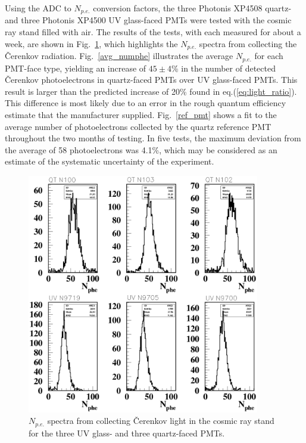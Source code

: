 Using the ADC to $N_{p.e.}$ conversion factors, the three Photonis XP4508
quartz- and three Photonis XP4500 UV glass-faced PMTs were tested with 
the cosmic ray stand filled with air.  The results of the tests, with each
measured for about a week, are shown in Fig.~\ref{numphe_all}, which
highlights the $N_{p.e.}$ spectra from collecting the {\v C}erenkov
radiation.  Fig.~\ref{avg_numphe} illustrates the average $N_{p.e.}$ for 
each PMT-face type, yielding an increase of $45 \pm 4$\% in the number of 
detected {\v C}erenkov photoelectrons in quartz-faced PMTs over UV 
glass-faced PMTs.  This result is larger than the predicted increase of 20\% 
found in eq.(\ref{eq:light_ratio}).  This difference is most likely due to 
an error in the rough quantum efficiency estimate that the manufacturer 
supplied.  Fig.~\ref{ref_pmt} shows a fit to the average number of 
photoelectrons collected by the quartz reference PMT throughout the two 
months of testing.  In five tests, the maximum deviation from the average of 
58 photoelectrons was 4.1\%, which may be considered as an estimate of the 
systematic uncertainty of the experiment. 

\begin{figure}
\hspace{0.5cm}
\begin{centering}
\includegraphics[height=10.5cm]{PMT-studies/all_phe_spectra.eps}
\vspace{0.5cm}
\caption{\small{$N_{p.e.}$ spectra from collecting {\v C}erenkov light in 
the cosmic ray stand for the three UV glass- and three quartz-faced PMTs.}}
\label{numphe_all}
\end{centering}
\end{figure}

